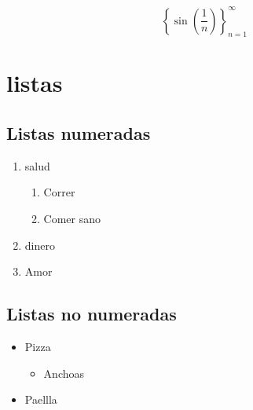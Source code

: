 \documentclass{article}
\begin{document}

$$\left\{\sin\left(\frac{1}{n}\right)\right\}_{n=1}^\infty$$

\section{listas}

\subsection{Listas numeradas}
\begin{enumerate}
	\item salud
	\begin{enumerate}
		\item Correr
		\item Comer sano
	\end{enumerate}
	\item dinero
	\item Amor
\end{enumerate}

\subsection{Listas no numeradas}
\begin{itemize}
	\item Pizza
	\begin{itemize}
		\item	Anchoas
	\end{itemize}
	\item Paellla
\end{itemize}

\end{document}
